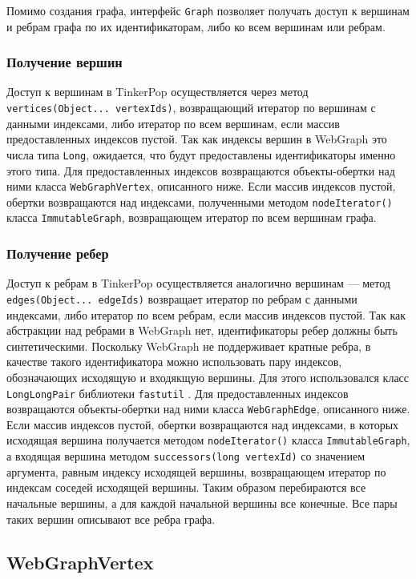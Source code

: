 \documentclass[times,specification,annotation]{itmo-student-thesis}
\begin{document}
Помимо создания графа, интерфейс \texttt{Graph} позволяет получать доступ к вершинам и ребрам графа по их идентификаторам, либо ко всем вершинам или ребрам.

\subsubsection{Получение вершин}

Доступ к вершинам в TinkerPop осуществляется через метод \texttt{vertices(Object... vertexIds)}, возвращающий итератор по вершинам с данными индексами, либо итератор по всем вершинам, если массив предоставленных индексов пустой.
Так как индексы вершин в WebGraph это числа типа \texttt{Long}, ожидается, что будут предоставлены идентификаторы именно этого типа.
Для предоставленных индексов возвращаются объекты-обертки над ними класса \texttt{WebGraphVertex}, описанного ниже.
Если массив индексов пустой, обертки возвращаются над индексами, полученными методом \texttt{nodeIterator()} класса \texttt{ImmutableGraph}, возвращающем итератор по всем вершинам графа.

\subsubsection{Получение ребер}

Доступ к ребрам в TinkerPop осуществляется аналогично вершинам --- метод \texttt{edges(Object... edgeIds)} возвращает итератор по ребрам с данными индексами, либо итератор по всем ребрам, если массив индексов пустой.
Так как абстракции над ребрами в WebGraph нет, идентификаторы ребер должны быть синтетическими. Поскольку WebGraph не поддерживает кратные ребра, в качестве такого идентификатора можно использовать пару индексов, обозначающих исходящую и входякщую вершины. Для этого использовался класс \texttt{LongLongPair} библиотеки \texttt{fastutil} \cite{fastutil}.
Для предоставленных индексов возвращаются объекты-обертки над ними класса \texttt{WebGraphEdge}, описанного ниже.
Если массив индексов пустой, обертки возвращаются над индексами, в которых исходящая вершина получается методом \texttt{nodeIterator()} класса \texttt{ImmutableGraph}, а входящая вершина методом \texttt{successors(long vertexId)} со значением аргумента, равным индексу исходящей вершины, возвращающем итератор по индексам соседей исходящей вершины. Таким образом перебираются все начальные вершины, а для каждой начальной вершины все конечные. Все пары таких вершин описывают все ребра графа.

\subsection{WebGraphVertex}
\end{document}
